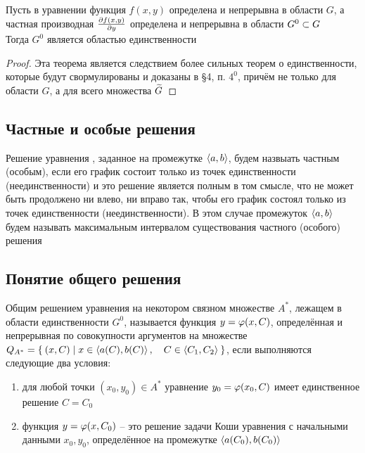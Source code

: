 \begin{theorem}\label{th:uniq:weak}
    Пусть в уравнении  функция $ f(x, y) $ определена и непрерывна в области $ G $, а частная производная $ \frac{\partial {f(x, y)}}{\partial {y}} $ определена и непрерывна в области $ G^0 \subset G $ \\
    Тогда $ G^0 $ является областью единственности
\end{theorem}

\begin{proof}
    Эта теорема является следствием более сильных теорем о единственности, которые будут свормулированы и доказаны в \S4, п. $ 4^0 $, причём не только для области $ G $, а для всего множества $ \widetilde{G} $
\end{proof}

\subsection{Частные и особые решения}

\begin{definition}
    Решение уравнения , заданное на промежутке $ \Braket{a, b} $, будем назвыать частным (особым), если его график состоит только из точек единственности (неединственности) и это решение является полным в том смысле, что не может быть продолжено ни влево, ни вправо так, чтобы его график состоял только из точек единственности (неединственности). В этом случае промежуток $ \Braket{a, b} $ будем называть максимальным интервалом существования частного (особого) решения
\end{definition}

\subsection{Понятие общего решения}

\begin{definition}
    Общим решением уравнения  на некотором связном множестве $ A^* $, лежащем в области единственности $ G^0 $, называется функция $ y = \varphi(x, C) $, определённая и непрерывная по совокупности аргументов на множестве $ Q_{A^*} = \Set{(x, C) | x \in \Braket{a(C), b(C)}, \quad C \in \Braket{C_1, C_2}} $, если выполняются следующие два условия:
    \begin{enumerate}
    	\item для любой точки $ (x_0, y_0) \in A^* $ уравнение $ y_0 = \varphi(x_0, C) $ имеет единственное решение $ C = C_0 $
        \item функция $ y = \varphi(x, C_0) $ -- это решение задачи Коши уравнения  с начальными данными $ x_0, y_0 $, определённое на промежутке $ \Braket{a(C_0), b(C_0)} $
    \end{enumerate}
\end{definition}


